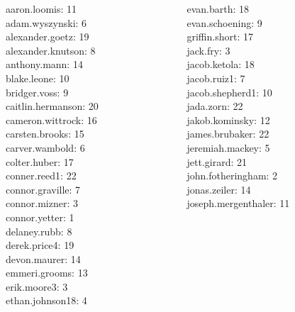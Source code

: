 \documentclass[10pt]{beamer}
\begin{document}
\begin{frame}
\footnotesize 
\vfill 
\begin{columns}
\begin{column}{0.33\textwidth}
aaron.loomis: 11 \\ 
adam.wyszynski: 6 \\ 
alexander.goetz: 19 \\ 
alexander.knutson: 8 \\ 
anthony.mann: 14 \\ 
blake.leone: 10 \\ 
bridger.voss: 9 \\ 
caitlin.hermanson: 20 \\ 
cameron.wittrock: 16 \\ 
carsten.brooks: 15 \\ 
carver.wambold: 6 \\ 
colter.huber: 17 \\ 
conner.reed1: 22 \\ 
connor.graville: 7 \\ 
connor.mizner: 3 \\ 
connor.yetter: 1 \\ 
delaney.rubb: 8 \\ 
derek.price4: 19 \\ 
devon.maurer: 14 \\ 
emmeri.grooms: 13 \\ 
erik.moore3: 3 \\ 
ethan.johnson18: 4 \\\end{column}
\begin{column}{0.33\textwidth}
evan.barth: 18 \\ 
evan.schoening: 9 \\ 
griffin.short: 17 \\ 
jack.fry: 3 \\ 
jacob.ketola: 18 \\ 
jacob.ruiz1: 7 \\ 
jacob.shepherd1: 10 \\ 
jada.zorn: 22 \\ 
jakob.kominsky: 12 \\ 
james.brubaker: 22 \\ 
jeremiah.mackey: 5 \\ 
jett.girard: 21 \\ 
john.fotheringham: 2 \\ 
jonas.zeiler: 14 \\ 
joseph.mergenthaler: 11 \\ 

\end{column}
\end{columns}
\end{frame}
\end{document}
